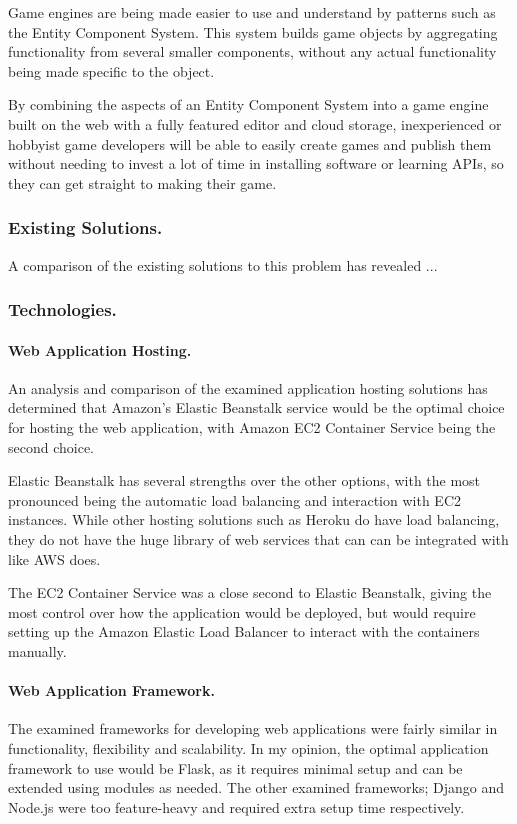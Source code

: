 \documentclass[a4paper, 12pt]{article}
\begin{document}
Game engines are being made easier to use and understand by patterns such as the Entity Component System. This system builds game objects by aggregating functionality from several smaller components, without any actual functionality being made specific to the object.

By combining the aspects of an Entity Component System into a game engine built on the web with a fully featured editor and cloud storage, inexperienced or hobbyist game developers will be able to easily create games and publish them without needing to invest a lot of time in installing software or learning APIs, so they can get straight to making their game.

\subsubsection{Existing Solutions.}
A comparison of the existing solutions to this problem has revealed ...

\subsubsection{Technologies.}
\paragraph{Web Application Hosting.}
An analysis and comparison of the examined application hosting solutions has determined that Amazon's Elastic Beanstalk service would be the optimal choice for hosting the web application, with Amazon EC2 Container Service being the second choice.

Elastic Beanstalk has several strengths over the other options, with the most pronounced being the automatic load balancing and interaction with EC2 instances. While other hosting solutions such as Heroku do have load balancing, they do not have the huge library of web services that can can be integrated with like AWS does.

The EC2 Container Service was a close second to Elastic Beanstalk, giving the most control over how the application would be deployed, but would require setting up the Amazon Elastic Load Balancer to interact with the containers manually.

\paragraph{Web Application Framework.}
The examined frameworks for developing web applications were fairly similar in functionality, flexibility and scalability. In my opinion, the optimal application framework to use would be Flask, as it requires minimal setup and can be extended using modules as needed. The other examined frameworks; Django and Node.js were too feature-heavy and required extra setup time respectively.
\end{document}
